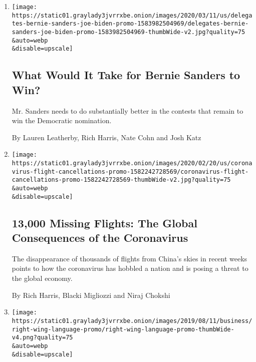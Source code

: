 \begin{enumerate}
\def\labelenumi{\arabic{enumi}.}
\item
  \href{/interactive/2020/03/12/us/elections/delegates-bernie-sanders-joe-biden.html}{}

  \texttt{[image: https://static01.graylady3jvrrxbe.onion/images/2020/03/11/us/delegates-bernie-sanders-joe-biden-promo-1583982504969/delegates-bernie-sanders-joe-biden-promo-1583982504969-thumbWide-v2.jpg?quality=75\\\&auto=webp\\\&disable=upscale]}

  \hypertarget{what-would-it-take-for-bernie-sanders-to-win}{%
  \subsection{What Would It Take for Bernie Sanders to
  Win?}\label{what-would-it-take-for-bernie-sanders-to-win}}

  Mr. Sanders needs to do substantially better in the contests that
  remain to win the Democratic nomination.

  By Lauren Leatherby, Rich Harris, Nate Cohn and Josh Katz
\item
  \href{/interactive/2020/02/21/business/coronavirus-airline-travel.html}{}

  \texttt{[image: https://static01.graylady3jvrrxbe.onion/images/2020/02/20/us/coronavirus-flight-cancellations-promo-1582242728569/coronavirus-flight-cancellations-promo-1582242728569-thumbWide-v2.jpg?quality=75\\\&auto=webp\\\&disable=upscale]}

  \hypertarget{13000-missing-flights-the-global-consequences-of-the-coronavirus}{%
  \subsection{13,000 Missing Flights: The Global Consequences of the
  Coronavirus}\label{13000-missing-flights-the-global-consequences-of-the-coronavirus}}

  The disappearance of thousands of flights from China's skies in recent
  weeks points to how the coronavirus has hobbled a nation and is posing
  a threat to the global economy.

  By Rich Harris, Blacki Migliozzi and Niraj Chokshi
\item
  \href{/interactive/2019/08/11/business/media/el-paso-killer-conservative-media.html}{}

  \texttt{[image: https://static01.graylady3jvrrxbe.onion/images/2019/08/11/business/right-wing-language-promo/right-wing-language-promo-thumbWide-v4.png?quality=75\\\&auto=webp\\\&disable=upscale]}


\end{enumerate}
